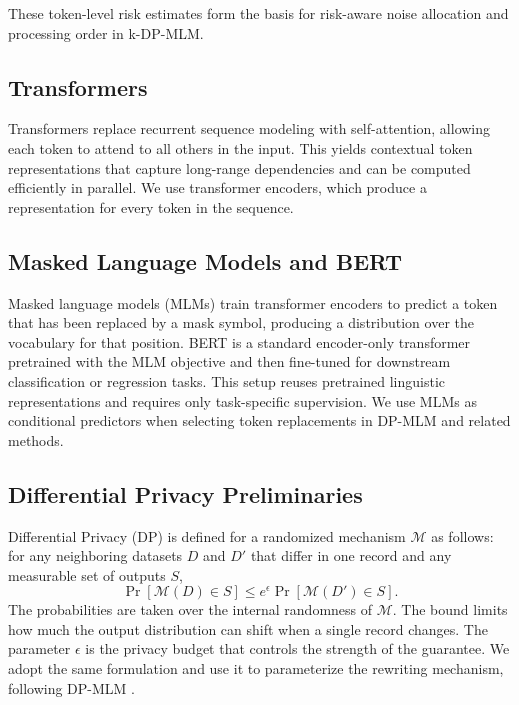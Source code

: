 \documentclass[10pt, a4paper]{article}
\begin{document}
These token-level risk estimates form the basis for risk-aware noise allocation and processing order in k-DP-MLM.

\subsection{Transformers}

Transformers \cite{vaswani_attention_2017} replace recurrent sequence modeling with self-attention, allowing each token to attend to all others in the input. This yields contextual token representations that capture long-range dependencies and can be computed efficiently in parallel. We use transformer encoders, which produce a representation for every token in the sequence.

\subsection{Masked Language Models and BERT}

Masked language models (MLMs) train transformer encoders to predict a token that has been replaced by a mask symbol, producing a distribution over the vocabulary for that position. BERT \cite{devlin_bert_2019} is a standard encoder-only transformer pretrained with the MLM objective and then fine-tuned for downstream classification or regression tasks. This setup reuses pretrained linguistic representations and requires only task-specific supervision. We use MLMs as conditional predictors when selecting token replacements in DP-MLM and related methods.

\subsection{Differential Privacy Preliminaries}\label{sec:dp-prelim}

Differential Privacy (DP) \cite{dwork_differential_2006} is defined for a randomized mechanism $\mathcal{M}$ as follows: for any neighboring datasets $D$ and $D'$ that differ in one record and any measurable set of outputs $S$,
\[
\Pr[\mathcal{M}(D) \in S] \le e^{\epsilon} \Pr[\mathcal{M}(D') \in S].
\]
The probabilities are taken over the internal randomness of $\mathcal{M}$. The bound limits how much the output distribution can shift when a single record changes. The parameter $\epsilon$ is the privacy budget that controls the strength of the guarantee. We adopt the same formulation and use it to parameterize the rewriting mechanism, following DP-MLM \cite{meisenbacher_dp-mlm_2024}.
\end{document}
